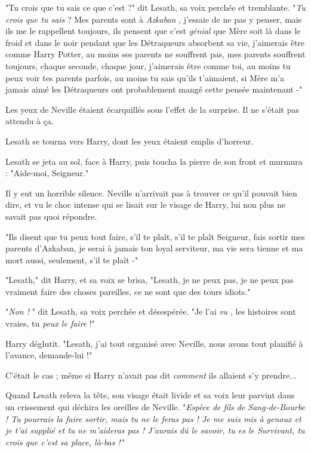 "Tu crois que tu sais ce que c'est ?" dit Lesath, sa voix perchée et tremblante. "\emph{Tu crois que tu sais}  ? Mes parents sont à \emph{Azkaban} , j'essaie de ne pas y penser, mais ils me le rappellent toujours, ils pensent que c'est \emph{génial}  que Mère soit là dans le froid et dans le noir pendant que les Détraqueurs absorbent sa vie, j'aimerais être comme Harry Potter, au moins ses parents ne souffrent pas, mes parents souffrent toujours, chaque seconde, chaque jour, j'aimerais être comme toi, au moins tu peux voir tes parents parfois, au moins tu sais qu'ils t'aimaient, si Mère m'a jamais aimé les Détraqueurs ont probablement mangé cette pensée maintenant -"

Les yeux de Neville étaient écarquillés sous l'effet de la surprise. Il ne s'était pas attendu à ça.

Lesath se tourna vers Harry, dont les yeux étaient emplis d'horreur.

Lesath se jeta au sol, face à Harry, puis toucha la pierre de son front et murmura : "Aide-moi, Seigneur."

Il y eut un horrible silence. Neville n'arrivait pas à trouver ce qu'il pouvait bien dire, et vu le choc intense qui se lisait sur le visage de Harry, lui non plus ne savait pas quoi répondre.

"Ils disent que tu peux tout faire, s'il te plaît, s'il te plaît Seigneur, fais sortir mes parents d'Azkaban, je serai à jamais ton loyal serviteur, ma vie sera tienne et ma mort aussi, seulement, s'il te plaît -"

"Lesath," dit Harry, et sa voix se brisa, "Lesath, je ne peux pas, je ne peux pas vraiment faire des choses pareilles, ce ne sont que des tours idiots."

"\emph{Non !} " dit Lesath, sa voix perchée et désespérée. "Je l'ai \emph{vu} , les histoires sont vraies, tu \emph{peux le faire}  !"

Harry déglutit. "Lesath, j'ai tout organisé avec Neville, nous avons tout planifié à l'avance, demande-lui !"

C'était le cas ; même si Harry n'avait pas dit \emph{comment}  ils allaient s'y prendre...

Quand Lesath releva la tête, son visage était livide et sa voix leur parvint dans un crissement qui déchira les oreilles de Neville. "\emph{Espèce de fils de Sang-de-Bourbe ! Tu pourrais la faire sortir, mais tu ne le feras pas ! Je me suis mis à genoux et je t'ai supplié et tu ne m'aideras pas ! J'aurais dû le savoir, tu es le Survivant, tu crois que c'est sa place, là-bas !"} 

